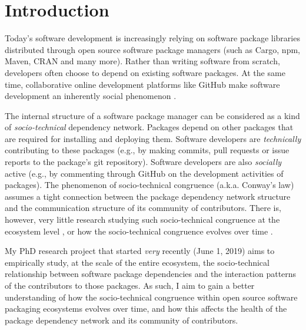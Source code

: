 \section{Introduction}
\label{sec:intro}

Today's software development is increasingly relying on software package libraries distributed through open source software package managers (such as Cargo, npm, Maven, CRAN and many more). Rather than writing software from scratch, developers often choose to depend on existing software packages.
At the same time, collaborative online development platforms like GitHub make software development an inherently social phenomenon \cite{DabbishSTH12,Mens2019IEEESW}.

The internal structure of a software package manager can be considered as a kind of \emph{socio-technical} dependency network. Packages depend on other packages that are required for installing and deploying them. Software developers are \emph{technically} contributing to these packages (e.g., by making commits, pull requests or issue reports to the package's git repository). Software developers are also \emph{socially} active (e.g., by commenting through GitHub on the development activities of packages).
The phenomenon of socio-technical congruence (a.k.a. Conway's law) \cite{Conway1968, Herbsleb1999} assumes a tight connection between the package dependency network structure and the communication structure of its community of contributors. There is, however, very little research studying such socio-technical congruence at the ecosystem level \cite{Palyart2018TSE}, or how the socio-technical congruence evolves over time \cite{Cataldo2008}.

My PhD research project that started \emph{very} recently (June 1, 2019) aims to empirically study, at the scale of the entire ecosystem, the socio-technical relationship between software package dependencies and the interaction patterns of the contributors to those packages.
As such, I aim to gain a better understanding of how the socio-technical congruence within open source software packaging ecosystems evolves over time, and how this affects the health of the package dependency network and its community of contributors.

